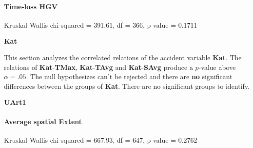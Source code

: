 \paragraph{Time-loss HGV}
Kruskal-Wallis chi-squared = 391.61, df = 366, p-value = 0.1711

\large
\centerline{\textbf{Kat}}
\normalsize
This section analyzes the correlated relations of the accident variable \textbf{Kat}. The relations of \textbf{Kat}-\textbf{TMax}, \textbf{Kat}-\textbf{TAvg} and \textbf{Kat}-\textbf{SAvg} produce a $p$-value above $\alpha=.05$. The null hypothesizes can't be rejected and there are \textbf{no} significant differences between the groups of \textbf{Kat}. There are no significant groups to identify.




\large
\centerline{\textbf{UArt1}}
\normalsize

\paragraph{Average spatial Extent}
Kruskal-Wallis chi-squared = 667.93, df = 647, p-value = 0.2762

